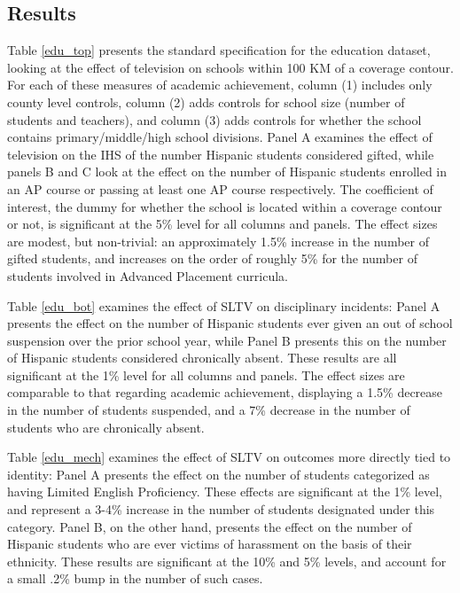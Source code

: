 \documentclass[11pt]{article}
\begin{document}
\subsection{Results}

Table \ref{edu_top} presents the standard specification for the education dataset, looking at the effect of television on schools within 100 KM of a coverage contour. For each of these measures of academic achievement, column (1) includes only county level controls, column (2) adds controls for school size (number of students and teachers), and column (3) adds controls for whether the school contains primary/middle/high school divisions. Panel A examines the effect of television on the IHS of the number Hispanic students considered gifted, while panels B and C look at the effect on the number of Hispanic students enrolled in an AP course or passing at least one AP course respectively. The coefficient of interest, the dummy for whether the school is located within a coverage contour or not, is significant at the 5\% level for all columns and panels. The effect sizes are modest, but non-trivial: an approximately 1.5\% increase in the number of gifted students, and increases on the order of roughly 5\% for the number of students involved in Advanced Placement curricula. 

Table \ref{edu_bot} examines the effect of SLTV on disciplinary incidents: Panel A presents the effect on the number of Hispanic students ever given an out of school suspension over the prior school year, while Panel B presents this on the number of Hispanic students considered chronically absent. These results are all significant at the 1\% level for all columns and panels. The effect sizes are comparable to that regarding academic achievement, displaying a 1.5\% decrease in the number of students suspended, and a 7\% decrease in the number of students who are chronically absent.

Table \ref{edu_mech} examines the effect of SLTV on outcomes more directly tied to identity: Panel A presents the effect on the number of students categorized as having Limited English Proficiency. These effects are significant at the 1\% level, and represent a 3-4\% increase in the number of students designated under this category. Panel B, on the other hand, presents the effect on the number of Hispanic students who are ever victims of harassment on the basis of their ethnicity. These results are significant at the 10\% and 5\% levels, and account for a small .2\% bump in the number of such cases. 
\end{document}
